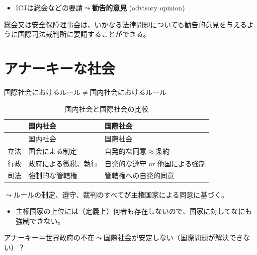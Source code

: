 \documentclass[
  xelatex,
  ja=standard]{bxjsarticle}
\providecommand{\tightlist}{%
  \setlength{\itemsep}{0pt}\setlength{\parskip}{0pt}}\usepackage{longtable,booktabs,array}
\begin{document}
\begin{itemize}
\tightlist
\item
  ICJは総会などの要請\(\leadsto\)\textbf{勧告的意見} (advisory opinion)
\end{itemize}

\begin{tcolorbox}[enhanced jigsaw, titlerule=0mm, leftrule=.75mm, toprule=.15mm, title=\textcolor{quarto-callout-note-color}{\faInfo}\hspace{0.5em}{\href{https://www.unic.or.jp/info/un/charter/text_japanese/}{国連憲章}　第96条}, left=2mm, colbacktitle=quarto-callout-note-color!10!white, rightrule=.15mm, opacitybacktitle=0.6, colframe=quarto-callout-note-color-frame, breakable, coltitle=black, opacityback=0, bottomrule=.15mm, colback=white, bottomtitle=1mm, toptitle=1mm, arc=.35mm]

総会又は安全保障理事会は、いかなる法律問題についても勧告的意見を与えるように国際司法裁判所に要請することができる。

\end{tcolorbox}

\hypertarget{ux30a2ux30caux30fcux30adux30fcux306aux793eux4f1a}{%
\section{アナーキーな社会}\label{ux30a2ux30caux30fcux30adux30fcux306aux793eux4f1a}}

国際社会におけるルール\(\neq\)国内社会におけるルール

\begin{longtable}[]{@{}lll@{}}
\caption{国内社会と国際社会の比較}\tabularnewline
\toprule\noalign{}
& 国内社会 & 国際社会 \\
\midrule\noalign{}
\endfirsthead
\toprule\noalign{}
& 国内社会 & 国際社会 \\
\midrule\noalign{}
\endhead
\bottomrule\noalign{}
\endlastfoot
立法 & 国会による制定 & 自発的な同意\(\approx\)条約 \\
行政 & 政府による徴税、執行 & 自発的な遵守 or 他国による強制 \\
司法 & 強制的な管轄権 & 管轄権への自発的同意 \\
\end{longtable}

\(\leadsto\)ルールの制定、遵守、裁判のすべてが主権国家による同意に基づく。

\begin{itemize}
\tightlist
\item
  主権国家の上位には（定義上）何者も存在しないので、国家に対してなにも強制できない。
\end{itemize}

アナーキー＝世界政府の不在\(\leadsto\)国際社会が安定しない（国際問題が解決できない）？


  
\end{document}
